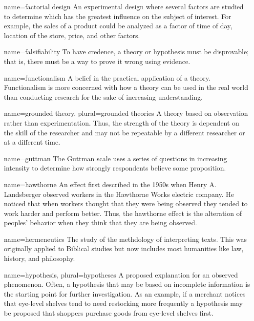 {name={factorial design}}
{%
	An experimental design where several factors are studied to determine which has the greatest influence on the subject of interest. For example, the sales of a product could be analyzed as a factor of time of day, location of the store, price, and other factors.
}

{name={falsifiability}}
{%
	To have credence, a theory or hypothesis must be disprovable; that is, there must be a way to prove it wrong using evidence.
}

{name={functionalism}}
{%
	A belief in the practical application of a theory. Functionalism is more concerned with how a theory can be used in the real world than conducting	research for the sake of increasing understanding. 
}

{name={grounded theory},
	plural={grounded theories}}
{%
	A theory based on observation rather than experimentation. Thus, the strength of the theory is dependent on the skill of the researcher and may not be repeatable by a different researcher or at a different time.
}

{name={guttman}}
{%
	The Guttman scale uses a series of questions in increasing intensity to determine how strongly respondents believe some proposition. 
}

{name={hawthorne}}
{%
	An effect first described in the 1950s when Henry A. Landsberger observed workers in the Hawthorne Works electric company. He noticed that when workers thought that they were being observed they tended to work harder and perform better. Thus, the hawthorne effect is the alteration of peoples' behavior when they think that they are being observed.
}

{name={hermeneutics}}
{%
	The study of the methdology of interpreting texts. This was originally applied to Biblical studies but now includes most humanities like law, history, and philosophy.
}

{name={hypothesis},
	plural={hypotheses}}
{%
	A proposed explanation for an observed phenomenon. Often, a hypothesis that may be based on incomplete information is the starting point for further investigation. As an example, if a merchant notices that eye-level shelves tend to need restocking more frequently a hypothesis may be proposed that shoppers purchase goods from eye-level shelves first. 
}

